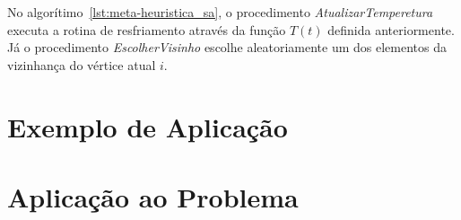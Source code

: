 No algorítimo~\ref{lst:meta-heuristica_sa}, o procedimento \textit{AtualizarTemperetura} executa a
rotina de resfriamento através da função $T(t)$ definida anteriormente. Já o procedimento
\textit{EscolherVisinho} escolhe aleatoriamente um dos elementos da vizinhança do vértice atual $i$.

\section{Exemplo de Aplicação}
\section{Aplicação ao Problema}

